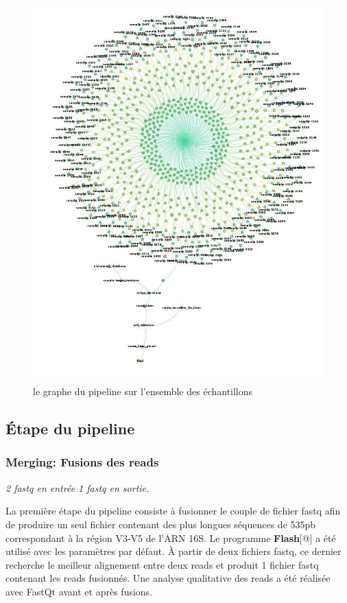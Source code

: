 \documentclass[12pt,a4paper]{article}
\begin{document}
\begin{figure}[ht]
\begin{center}
\includegraphics[scale=0.4]{img/dag.jpg}\hfill
\end{center}
\caption{le graphe du pipeline sur l'ensemble des échantillons}
\label{dag}
\end{figure}

\subsection{Étape du pipeline}
\subsubsection{Merging: Fusions des reads}\begin{center}\emph{ 2 fastq en entrée 1 fastq en sortie. } \end{center}

La première étape du pipeline consiste à fusionner le couple de fichier fastq afin de produire un seul fichier contenant des plus longues séquences de 535pb correspondant à la région V3-V5 de l’ARN 16S.
Le programme \textbf{Flash}[@] a été utilisé avec les paramètres par défaut. À partir de deux fichiers fastq, ce dernier recherche le meilleur alignement entre deux reads et produit 1 fichier fastq contenant les reads fusionnés.
Une analyse qualitative des reads a été réalisée avec FastQt\citep{Beck} avant et après fusions.
\end{document}

